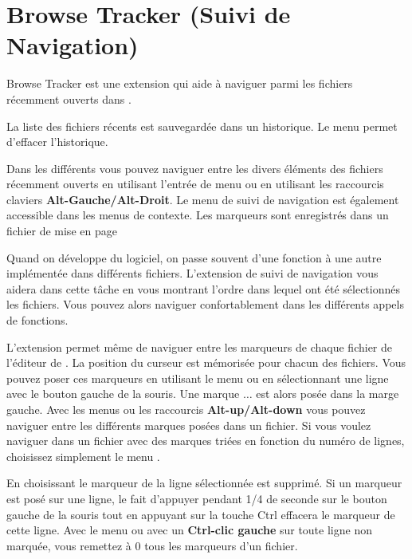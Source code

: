 \section{Browse Tracker (Suivi de Navigation)}\label{sec:browsetracker}

Browse Tracker est une extension qui aide à naviguer parmi les fichiers récemment ouverts dans \codeblocks.

La liste des fichiers récents est sauvegardée dans un historique.
Le menu  permet d'effacer l'historique.

Dans les différents  vous pouvez naviguer entre les divers éléments des fichiers récemment ouverts en utilisant l'entrée de menu  ou en utilisant les raccourcis claviers \textbf{Alt-Gauche/Alt-Droit}. Le menu de suivi de navigation est également accessible dans les menus de contexte. Les marqueurs sont enregistrés dans un fichier de mise en page 

Quand on développe du logiciel, on passe souvent d'une fonction à une autre implémentée dans différents fichiers. L'extension de suivi de navigation vous aidera dans cette tâche en vous montrant l'ordre dans lequel ont été sélectionnés les fichiers. Vous pouvez alors naviguer confortablement dans les différents appels de fonctions.

L'extension permet même de naviguer entre les marqueurs de chaque fichier de l'éditeur de \codeblocks. La position du curseur est mémorisée pour chacun des fichiers. Vous pouvez poser ces marqueurs en utilisant le menu  ou en sélectionnant une ligne avec le bouton gauche de la souris. Une marque $\ldots$ est alors posée dans la marge gauche. Avec les menus  ou les raccourcis \textbf{Alt-up/Alt-down} vous pouvez naviguer entre les différents marques posées dans un fichier. Si vous voulez naviguer dans un fichier avec des marques triées en fonction du numéro de lignes, choisissez simplement le menu .

En choisissant  le marqueur de la ligne sélectionnée est supprimé. Si un marqueur est posé sur une ligne, le fait d'appuyer pendant 1/4 de seconde sur le bouton gauche de la souris tout en appuyant sur la touche Ctrl effacera le marqueur de cette ligne. Avec le menu  ou avec un \textbf{Ctrl-clic gauche} sur toute ligne non marquée, vous remettez à 0 tous les marqueurs d'un fichier.

